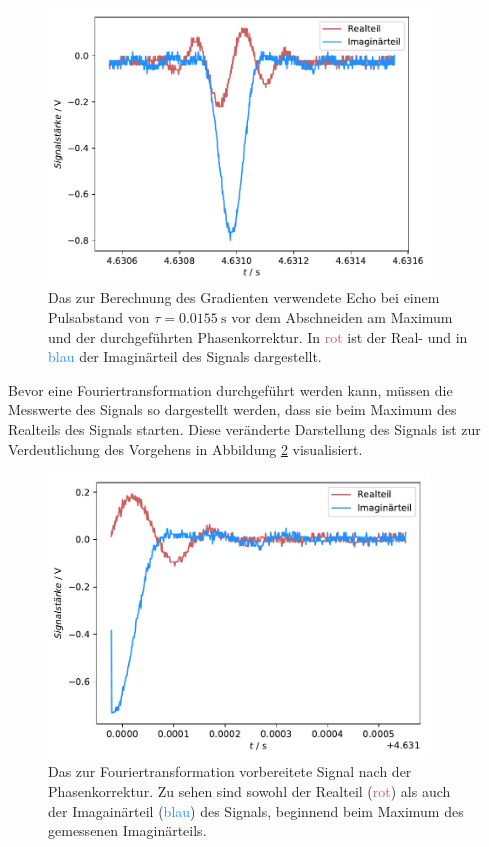 \begin{figure}[H]
  \centering
  \includegraphics[width=0.9\textwidth]{../Auswertung/echo_vorher.pdf}
  \caption{Das zur Berechnung des Gradienten verwendete Echo bei einem Pulsabstand von $\tau = \SI{0.0155}{\second}$
  vor dem Abschneiden am Maximum und der durchgeführten
  Phasenkorrektur. In \textcolor{indianred}{rot} ist der Real- und in \textcolor{dodgerblue}{blau} der Imaginärteil des Signals dargestellt.}
  \label{fig:echo_vorher}
\end{figure} \noindent
Bevor eine Fouriertransformation durchgeführt werden kann, müssen die Messwerte des Signals so dargestellt werden, dass sie
beim Maximum des Realteils des Signals starten. Diese veränderte Darstellung des Signals ist zur Verdeutlichung des Vorgehens in
Abbildung \ref{fig:echo_ab} visualisiert.
\begin{figure}[H]
  \centering
  \includegraphics[width=0.9\textwidth]{../Auswertung/echo_phasenkorrektur.pdf}
  \caption{Das zur Fouriertransformation vorbereitete Signal nach der Phasenkorrektur. Zu sehen sind sowohl der Realteil (\textcolor{indianred}{rot}) als auch der
  Imagainärteil (\textcolor{dodgerblue}{blau}) des Signals, beginnend beim Maximum des gemessenen Imaginärteils.}
  \label{fig:echo_ab}
\end{figure} \noindent
